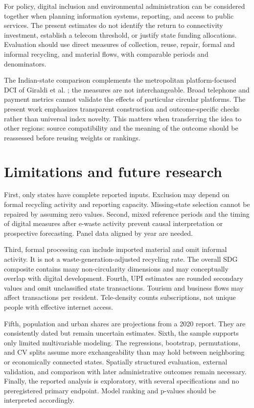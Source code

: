 \documentclass[11pt,a4paper]{article}
\begin{document}
For policy, digital inclusion and environmental administration can be considered together when planning information systems, reporting, and access to public services. The present estimates do not identify the return to connectivity investment, establish a telecom threshold, or justify state funding allocations. Evaluation should use direct measures of collection, reuse, repair, formal and informal recycling, and material flows, with comparable periods and denominators.

The Indian-state comparison complements the metropolitan platform-focused DCI of Giraldi et al. \cite{giraldi}; the measures are not interchangeable. Broad telephone and payment metrics cannot validate the effects of particular circular platforms. The present work emphasizes transparent construction and outcome-specific checks rather than universal index novelty. This matters when transferring the idea to other regions: source compatibility and the meaning of the outcome should be reassessed before reusing weights or rankings.

\section{Limitations and future research}
First, only \SampleN{} states have complete reported inputs. Exclusion may depend on formal recycling activity and reporting capacity. Missing-state selection cannot be repaired by assuming zero values. Second, mixed reference periods and the timing of digital measures after e-waste activity prevent causal interpretation or prospective forecasting. Panel data aligned by year are needed.

Third, formal processing can include imported material and omit informal activity. It is not a waste-generation-adjusted recycling rate. The overall SDG composite contains many non-circularity dimensions and may conceptually overlap with digital development. Fourth, UPI estimates are rounded secondary values and omit unclassified state transactions. Tourism and business flows may affect transactions per resident. Tele-density counts subscriptions, not unique people with effective internet access.

Fifth, population and urban shares are projections from a 2020 report. They are consistently dated but remain uncertain estimates. Sixth, the sample supports only limited multivariable modeling. The regressions, bootstrap, permutations, and CV splits assume more exchangeability than may hold between neighboring or economically connected states. Spatially structured evaluation, external validation, and comparison with later administrative outcomes remain necessary. Finally, the reported analysis is exploratory, with several specifications and no preregistered primary endpoint. Model ranking and p-values should be interpreted accordingly.
\end{document}
